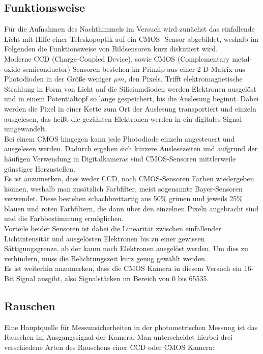 \documentclass[ngerman,ruledheaders=section,class=report,thesis={type=Protokoll},accentcolor=1b,marginpar=false,parskip=half-,fontsize=11pt,]{tudapub}
\begin{document}
	\subsection{Funktionsweise}
	Für die Aufnahmen des Nachthimmels im Versuch wird zunächst das einfallende Licht mit Hilfe einer Teleskopoptik auf ein CMOS- Sensor abgebildet, weshalb im Folgenden die Funktionsweise von Bildsensoren kurz diskutiert wird. \\
	Moderne CCD (Charge-Coupled Device), sowie CMOS (Complementary metal-oxide-semiconductor) Sensoren bestehen im Prinzip aus einer 2-D Matrix aus Photodioden in der Größe weniger $\si{\mu m}$, den Pixels. Trifft elektromagnetische Strahlung in Form von Licht auf die Siliciumdioden werden Elektronen ausgelöst und in einem Potentialtopf so lange gespeichert, bis die Auslesung beginnt. Dabei werden die Pixel in einer Kette zum Ort der Auslesung transportiert und einzeln ausgelesen, das heißt die gezählten Elektronen werden in ein digitales Signal umgewandelt. \\
	Bei einem CMOS hingegen kann jede Photodiode einzeln angesteuert und ausgelesen werden. Dadurch ergeben sich kürzere Auslesezeiten und aufgrund der häufigen Verwendung in Digitalkameras sind CMOS-Sensoren mittlerweile günstiger Herzustellen. \\
	Es ist anzumerken, dass weder CCD, noch CMOS-Sensoren Farben wiedergeben können, weshalb man zusätzlich Farbfilter, meist sogenannte Bayer-Sensoren verwendet. Diese bestehen schachbrettartig aus 50\% grünen und jeweils 25\% blauen und roten Farbfiltern, die dann über den einzelnen Pixeln angebracht sind und die Farbbestimmung ermöglichen. \\
	Vorteile beider Sensoren ist dabei die Linearität zwischen einfallender Lichtintensität und ausgelösten Elektronen bis zu einer gewissen Sättigungsgrenze, ab der kaum noch Elektronen ausgelöst werden. Um dies zu verhindern, muss die Belichtungszeit kurz genug gewählt werden. \\
	Es ist weiterhin anzumerken, dass die CMOS Kamera in diesem Versuch ein 16-Bit Signal ausgibt, also Signalstärken im Bereich von 0 bis 65535. 
	
	
	\subsection{Rauschen}\label{Section 2.2.2}
	Eine Hauptquelle für Messunsicherheiten in der photometrischen Messung ist das Rauschen im Ausgangssignal der Kamera. Man unterscheidet hierbei drei verschiedene Arten des Rauschens einer CCD oder CMOS Kamera:
	
\end{document}
